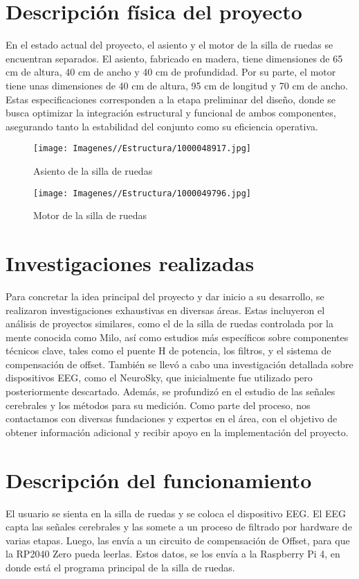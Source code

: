 \documentclass{article}
\begin{document}
\section{Descripción física del proyecto}
En el estado actual del proyecto, el asiento y el motor de la silla de ruedas se encuentran separados. El asiento, fabricado en madera, tiene dimensiones de 65 cm de altura, 40 cm de ancho y 40 cm de profundidad. Por su parte, el motor tiene unas dimensiones de 40 cm de altura, 95 cm de longitud y 70 cm de ancho. Estas especificaciones corresponden a la etapa preliminar del diseño, donde se busca optimizar la integración estructural y funcional de ambos componentes, asegurando tanto la estabilidad del conjunto como su eficiencia operativa.

\begin{figure}[H]
    \centering
    \texttt{[image: Imagenes//Estructura/1000048917.jpg]}
    \caption{Asiento de la silla de ruedas}
\end{figure}

\begin{figure}[H]
    \centering
    \texttt{[image: Imagenes//Estructura/1000049796.jpg]}
    \caption{Motor de la silla de ruedas}
\end{figure}

\section{Investigaciones realizadas}

Para concretar la idea principal del proyecto y dar inicio a su desarrollo, se realizaron investigaciones exhaustivas en diversas áreas. Estas incluyeron el análisis de proyectos similares, como el de la silla de ruedas controlada por la mente conocida como Milo, así como estudios más específicos sobre componentes técnicos clave, tales como el puente H de potencia, los filtros, y el sistema de compensación de offset. También se llevó a cabo una investigación detallada sobre dispositivos EEG, como el NeuroSky, que inicialmente fue utilizado pero posteriormente descartado. Además, se profundizó en el estudio de las señales cerebrales y los métodos para su medición. Como parte del proceso, nos contactamos con diversas fundaciones y expertos en el área, con el objetivo de obtener información adicional y recibir apoyo en la implementación del proyecto.

\section{Descripción del funcionamiento}
El usuario se sienta en la silla de ruedas y se coloca el dispositivo EEG. El EEG capta las señales cerebrales y las somete a un proceso de filtrado por hardware de varias etapas. Luego, las envía a un circuito de compensación de Offset, para que la RP2040 Zero pueda leerlas. Estos datos, se los envía a la Raspberry Pi 4, en donde está el programa principal de la silla de ruedas.
\end{document}
